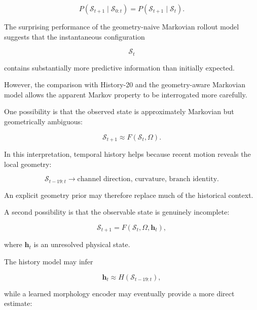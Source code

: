 \documentclass[11pt]{article}
\begin{document}
\begin{equation}
P
\left(
\mathcal{S}_{t+1}
\mid
\mathcal{S}_{0:t}
\right)
=
P
\left(
\mathcal{S}_{t+1}
\mid
\mathcal{S}_t
\right).
\end{equation}

The surprising performance of the geometry-naive Markovian rollout model suggests that the instantaneous configuration

\begin{equation}
\mathcal{S}_t
\end{equation}

contains substantially more predictive information than initially expected.

However, the comparison with History-20 and the geometry-aware Markovian model allows the apparent Markov property to be interrogated more carefully.

One possibility is that the observed state is approximately Markovian but geometrically ambiguous:

\begin{equation}
\mathcal{S}_{t+1}
\approx
F
\left(
\mathcal{S}_t,
\Omega
\right).
\end{equation}

In this interpretation, temporal history helps because recent motion reveals the local geometry:

\begin{equation}
\mathcal{S}_{t-19:t}
\longrightarrow
\text{channel direction, curvature, branch identity}.
\end{equation}

An explicit geometry prior may therefore replace much of the historical context.

A second possibility is that the observable state is genuinely incomplete:

\begin{equation}
\mathcal{S}_{t+1}
=
F
\left(
\mathcal{S}_t,
\Omega,
\mathbf{h}_t
\right),
\end{equation}

where \(\mathbf{h}_t\) is an unresolved physical state.

The history model may infer

\begin{equation}
\mathbf{h}_t
\approx
H
\left(
\mathcal{S}_{t-19:t}
\right),
\end{equation}

while a learned morphology encoder may eventually provide a more direct estimate:
\end{document}
